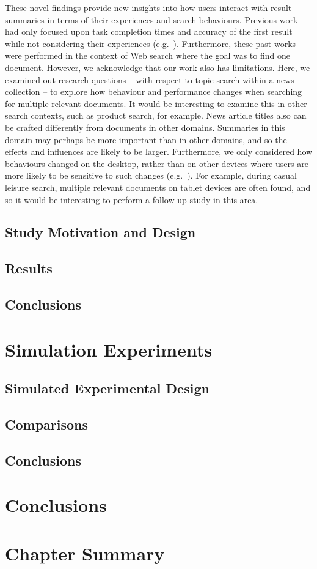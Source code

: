 These novel findings provide new insights into how users interact with result summaries in terms of their experiences and search behaviours. Previous work had only focused upon task completion times and accuracy of the first result while not considering their experiences (e.g.~\cite{cutrell2007result_page, kaisser2008improving}). Furthermore, these past works were performed in the context of Web search where the goal was to find one document. However, we acknowledge that our work also has limitations. Here, we examined out research questions -- with respect to topic search within a news collection -- to explore how behaviour and performance changes when searching for multiple relevant documents. It would be interesting to examine this in other search contexts, such as product search, for example. News article titles also can be crafted differently from documents in other domains. Summaries in this domain may perhaps be more important than in other domains, and so the effects and influences are likely to be larger. Furthermore, we only considered how behaviours changed on the desktop, rather than on other devices where users are more likely to be sensitive to such changes (e.g.~\cite{kim2014eye_tracking,kim2017mobile_search_snippets}). For example, during casual leisure search, multiple relevant documents on tablet devices are often found, and so it would be interesting to perform a follow up study in this area.


\subsection{Study Motivation and Design}
\subsection{Results}
\subsection{Conclusions}

\section{Simulation Experiments}
\subsection{Simulated Experimental Design}
\subsection{Comparisons}
\subsection{Conclusions}

\section{Conclusions}
\section{Chapter Summary}